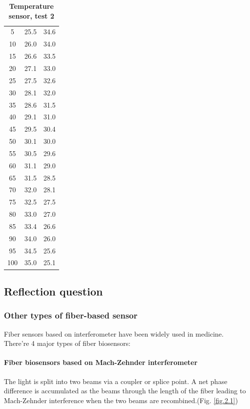 \documentclass[12pt,a4paper,UTF8]{article}
\begin{document}
\begin{table}[ht]
\begin{minipage}{0.5\textwidth}
\begin{tabular}{ccc}
                5 & 25.5 & 34.6 \\
                10 & 26.0 & 34.0 \\
                15 & 26.6 & 33.5 \\
                20 & 27.1 & 33.0 \\
                25 & 27.5 & 32.6 \\
                30 & 28.1 & 32.0 \\
                35 & 28.6 & 31.5 \\
                40 & 29.1 & 31.0 \\
                45 & 29.5 & 30.4 \\
                50 & 30.1 & 30.0 \\
                55 & 30.5 & 29.6 \\
                60 & 31.1 & 29.0 \\
                65 & 31.5 & 28.5 \\
                70 & 32.0 & 28.1 \\
                75 & 32.5 & 27.5 \\
                80 & 33.0 & 27.0 \\
                85 & 33.4 & 26.6 \\
                90 & 34.0 & 26.0 \\
                95 & 34.5 & 25.6 \\
                100 & 35.0 & 25.1 \\
                \bottomrule
            \end{tabular}
            \caption{\textbf{Temperature sensor, test 2}}
            \label{tab.2.2.2}
		\end{minipage}
	\end{table}

    \subsection{Reflection question}
        \subsubsection{Other types of fiber-based sensor\autocite{liReviewSpecialtyFiber2021}}
        Fiber sensors based on interferometer have been widely used in medicine. There're 4 major types of fiber biosensors:
        \paragraph{Fiber biosensors based on Mach-Zehnder interferometer}
        The light is split into two beams via a coupler or splice point. 
        A net phase difference is accumulated as the beams through the length of the fiber leading to Mach-Zehnder interference when the two beams are recombined.(Fig. \ref{fig.2.1})
\end{document}
